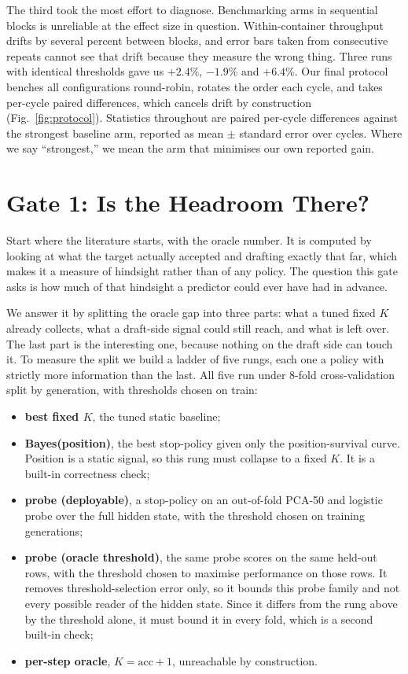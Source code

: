 \documentclass[conference]{IEEEtran}
\begin{document}
The third took the most effort to diagnose. Benchmarking arms in sequential blocks is
unreliable at the effect size in question. Within-container throughput drifts by several
percent between blocks, and error bars taken from consecutive repeats cannot see that drift
because they measure the wrong thing. Three runs with identical thresholds gave us $+2.4\%$,
$-1.9\%$ and $+6.4\%$. Our final protocol benches all configurations round-robin, rotates the
order each cycle, and takes per-cycle paired differences, which cancels drift by construction
(Fig.~\ref{fig:protocol}). Statistics throughout are paired per-cycle differences against the
strongest baseline arm, reported as mean $\pm$ standard error over cycles. Where we say
``strongest,'' we mean the arm that minimises our own reported gain.

\section{Gate 1: Is the Headroom There?}
\label{sec:gate1}
Start where the literature starts, with the oracle number. It is computed by looking at what
the target actually accepted and drafting exactly that far, which makes it a measure of
hindsight rather than of any policy. The question this gate asks is how much of that hindsight
a predictor could ever have had in advance.

We answer it by splitting the oracle gap into three parts: what a tuned fixed $K$ already
collects, what a draft-side signal could still reach, and what is left over. The last part is
the interesting one, because nothing on the draft side can touch it. To measure the split we build a ladder of five
rungs, each one a policy with strictly more information than the last. All five run under
8-fold cross-validation split by generation, with thresholds chosen on train:

\begin{itemize}
\item \textbf{best fixed $K$}, the tuned static baseline;
\item \textbf{Bayes(position)}, the best stop-policy given only the position-survival curve.
Position is a static signal, so this rung must collapse to a fixed $K$. It is a built-in
correctness check;
\item \textbf{probe (deployable)}, a stop-policy on an out-of-fold PCA-50 and logistic probe
over the full hidden state, with the threshold chosen on training generations;
\item \textbf{probe (oracle threshold)}, the same probe scores on the same held-out rows, with
the threshold chosen to maximise performance on those rows. It removes threshold-selection
error only, so it bounds this probe family and not every possible reader of the hidden state.
Since it differs from the rung above by the threshold alone, it must bound it in every fold,
which is a second built-in check;
\item \textbf{per-step oracle}, $K = \mathrm{acc}+1$, unreachable by construction.
\end{itemize}
\end{document}
